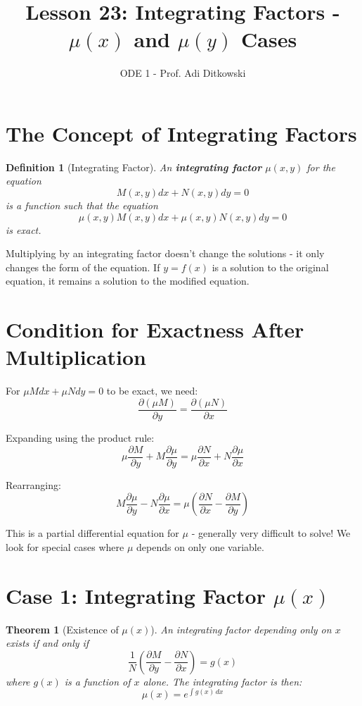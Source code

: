 \documentclass[12pt]{article}
\title{Lesson 23: Integrating Factors - $\mu(x)$ and $\mu(y)$ Cases}
\author{ODE 1 - Prof. Adi Ditkowski}
\date{}
\newtheorem{definition}{Definition}
\newtheorem{theorem}{Theorem}
\begin{document}
\maketitle

\section{The Concept of Integrating Factors}

\begin{definition}[Integrating Factor]
An \textbf{integrating factor} $\mu(x,y)$ for the equation
\[M(x,y)dx + N(x,y)dy = 0\]
is a function such that the equation
\[\mu(x,y)M(x,y)dx + \mu(x,y)N(x,y)dy = 0\]
is exact.
\end{definition}

\begin{keypoint}
Multiplying by an integrating factor doesn't change the solutions - it only changes the form of the equation. If $y = f(x)$ is a solution to the original equation, it remains a solution to the modified equation.
\end{keypoint}

\section{Condition for Exactness After Multiplication}

For $\mu M dx + \mu N dy = 0$ to be exact, we need:
\[\frac{\partial(\mu M)}{\partial y} = \frac{\partial(\mu N)}{\partial x}\]

Expanding using the product rule:
\[\mu \frac{\partial M}{\partial y} + M\frac{\partial \mu}{\partial y} = \mu \frac{\partial N}{\partial x} + N\frac{\partial \mu}{\partial x}\]

Rearranging:
\[M\frac{\partial \mu}{\partial y} - N\frac{\partial \mu}{\partial x} = \mu\left(\frac{\partial N}{\partial x} - \frac{\partial M}{\partial y}\right)\]

\begin{warning}
This is a partial differential equation for $\mu$ - generally very difficult to solve! We look for special cases where $\mu$ depends on only one variable.
\end{warning}

\section{Case 1: Integrating Factor $\mu(x)$}

\begin{theorem}[Existence of $\mu(x)$]
An integrating factor depending only on $x$ exists if and only if
\[\frac{1}{N}\left(\frac{\partial M}{\partial y} - \frac{\partial N}{\partial x}\right) = g(x)\]
where $g(x)$ is a function of $x$ alone. The integrating factor is then:
\[\mu(x) = e^{\int g(x)\,dx}\]
\end{theorem}
\end{document}
